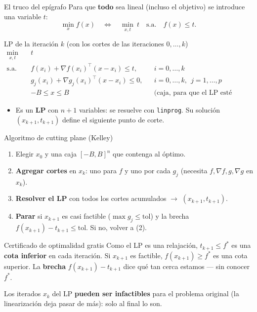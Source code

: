 \documentclass[aspectratio=169]{beamer}
\newcommand{\grad}{\nabla}
\begin{document}
\begin{frame}{El truco del epígrafo}
  Para que \textbf{todo} sea lineal (incluso el objetivo) se introduce una variable $t$:
  \[ \min_x f(x)\quad\Longleftrightarrow\quad \min_{x,t}\ t\quad\text{s.a.}\quad f(x)\le t . \]
  \begin{alertblock}{LP de la iteración $k$ (con los cortes de las iteraciones $0,\dots,k$)}
    \[ \begin{aligned}
    \min_{x,t}\quad & t\\
    \text{s.a.}\quad & f(x_i)+\grad f(x_i)^\top(x-x_i)\le t, && i=0,\dots,k\\
    & g_j(x_i)+\grad g_j(x_i)^\top(x-x_i)\le 0, && i=0,\dots,k,\ \ j=1,\dots,p\\
    & -B\le x\le B &&\text{(caja, para que el LP esté acotado)}
    \end{aligned} \]
  \end{alertblock}
  \begin{itemize}
    \item Es un \textbf{LP} con $n+1$ variables: se resuelve con \texttt{linprog}. Su solución $(x_{k+1},t_{k+1})$ define el siguiente punto de corte.
  \end{itemize}
\end{frame}

\begin{frame}{Algoritmo de cutting plane (Kelley)}
  \begin{enumerate}
    \item Elegir $x_0$ y una caja $[-B,B]^n$ que contenga al óptimo.
    \item \textbf{Agregar cortes} en $x_k$: uno para $f$ y uno por cada $g_j$ (necesita $f,\grad f,g,\grad g$ en $x_k$).
    \item \textbf{Resolver el LP} con todos los cortes acumulados $\to$ $(x_{k+1},t_{k+1})$.
    \item \textbf{Parar} si $x_{k+1}$ es casi factible ($\max g_j\le\text{tol}$) y la brecha $f(x_{k+1})-t_{k+1}\le\text{tol}$. Si no, volver a (2).
  \end{enumerate}
  \begin{exampleblock}{Certificado de optimalidad gratis}
    Como el LP es una relajación, $t_{k+1}\le f^\ast$ es una \textbf{cota inferior} en cada iteración. Si $x_{k+1}$ es factible, $f(x_{k+1})\ge f^\ast$ es una cota superior. La \textbf{brecha} $f(x_{k+1})-t_{k+1}$ dice qué tan cerca estamos --- sin conocer $f^\ast$.
  \end{exampleblock}
  \small Los iterados $x_{k}$ del LP \textbf{pueden ser infactibles} para el problema original (la linearización deja pasar de más): solo al final lo son.
\end{frame}
\end{document}
